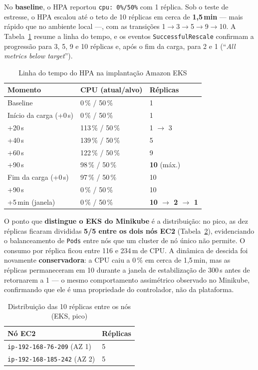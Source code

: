 \documentclass[conference]{IEEEtran}
\begin{document}
No \textbf{baseline}, o HPA reportou \texttt{cpu: 0\%/50\%} com 1 réplica. Sob o teste de estresse,
o HPA escalou até o teto de 10 réplicas em cerca de \textbf{1,5\,min} --- mais rápido que no
ambiente local ---, com as transições 1$\to$3$\to$5$\to$9$\to$10. A Tabela~\ref{tab:eks} resume a
linha do tempo, e os eventos \texttt{SuccessfulRescale} confirmam a progressão para 3, 5, 9 e 10
réplicas e, após o fim da carga, para 2 e 1 (``\textit{All metrics below target}'').

\begin{table}[!t]
\caption{Linha do tempo do HPA na implantação Amazon EKS}
\label{tab:eks}
\centering
\footnotesize
\begin{tabular}{@{}lll@{}}
\toprule
\textbf{Momento} & \textbf{CPU (atual/alvo)} & \textbf{Réplicas} \\
\midrule
Baseline & 0\,\% / 50\,\% & 1 \\
Início da carga (+0\,s) & 0\,\% / 50\,\% & 1 \\
+20\,s & 113\,\% / 50\,\% & 1 $\to$ 3 \\
+40\,s & 139\,\% / 50\,\% & 5 \\
+60\,s & 122\,\% / 50\,\% & 9 \\
+90\,s & 98\,\% / 50\,\% & \textbf{10} (máx.) \\
Fim da carga (+0\,s) & 97\,\% / 50\,\% & 10 \\
+90\,s & 0\,\% / 50\,\% & 10 \\
+5\,min (janela) & 0\,\% / 50\,\% & \textbf{10 $\to$ 2 $\to$ 1} \\
\bottomrule
\end{tabular}
\end{table}

O ponto que \textbf{distingue o EKS do Minikube} é a distribuição: no pico, as dez réplicas
ficaram divididas \textbf{5/5 entre os dois nós EC2} (Tabela~\ref{tab:dist}), evidenciando o
balanceamento de \texttt{Pods} entre nós que um cluster de nó único não permite. O consumo por
réplica ficou entre 116 e 234\,m de CPU. A dinâmica de descida foi novamente \textbf{conservadora}:
a CPU caiu a 0\,\% em cerca de 1,5\,min, mas as réplicas permaneceram em 10 durante a janela de
estabilização de 300\,s antes de retornarem a 1 --- o mesmo comportamento assimétrico observado no
Minikube, confirmando que ele é uma propriedade do controlador, não da plataforma.

\begin{table}[!t]
\caption{Distribuição das 10 réplicas entre os nós (EKS, pico)}
\label{tab:dist}
\centering
\footnotesize
\begin{tabular}{@{}ll@{}}
\toprule
\textbf{Nó EC2} & \textbf{Réplicas} \\
\midrule
\texttt{ip-192-168-76-209} (AZ 1) & 5 \\
\texttt{ip-192-168-185-242} (AZ 2) & 5 \\
\bottomrule
\end{tabular}
\end{table}
\end{document}
